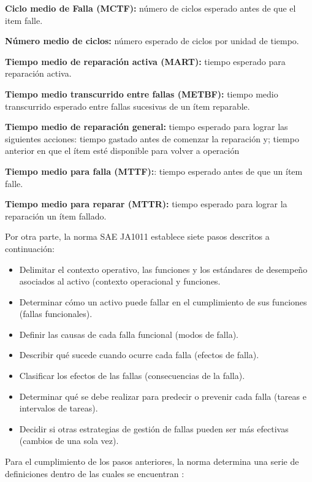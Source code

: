 \begin{description}
\item \textbf{Ciclo medio de Falla (MCTF):} número de ciclos esperado antes de que el item falle.
\item \textbf{Número medio de ciclos:} número esperado de ciclos por unidad de tiempo.
\item \textbf{Tiempo medio de reparación activa (MART):} tiempo esperado para reparación activa.
\item \textbf{Tiempo medio transcurrido entre fallas (METBF):} tiempo medio transcurrido esperado entre fallas sucesivas de un ítem reparable.
\item \textbf{Tiempo medio de reparación general:} tiempo esperado para lograr las siguientes acciones: tiempo gastado antes de comenzar la reparación y; tiempo anterior en que el ítem esté disponible para volver a operación
\item \textbf{Tiempo medio para falla (MTTF):}: tiempo esperado antes de que un ítem falle.
\item \textbf{Tiempo medio para reparar (MTTR):} tiempo esperado para lograr la reparación un ítem fallado.
\end{description}

Por otra parte, la norma SAE JA1011 establece siete pasos descritos a continuación:\\

\begin{itemize}
\item Delimitar el contexto operativo, las funciones y los estándares de desempeño asociados al activo (contexto operacional y funciones.
\item Determinar cómo un activo puede fallar en el cumplimiento de sus funciones (fallas funcionales).
\item Definir las causas de cada falla funcional (modos de falla).
\item Describir qué sucede cuando ocurre cada falla (efectos de falla).
\item Clasificar los efectos de las fallas (consecuencias de la falla).
\item Determinar qué se debe realizar para predecir o prevenir cada falla (tareas e intervalos de tareas).
\item Decidir si otras estrategias de gestión de fallas pueden ser más efectivas (cambios de una sola vez). 
\end{itemize}

Para el cumplimiento de los pasos anteriores, la norma determina una serie de definiciones dentro de las cuales se encuentran \citep{saeja1011}:\\

